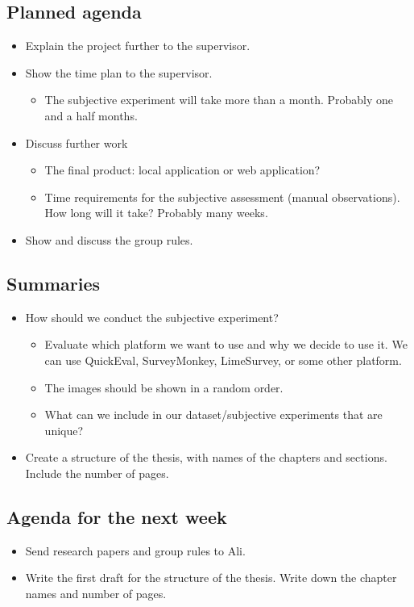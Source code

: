 \subsection*{Planned agenda}
\begin{itemize}
    \item Explain the project further to the supervisor.
    \item Show the time plan to the supervisor.
        \begin{itemize}
            \item The subjective experiment will take more than a month. Probably one and a half months.
    \end{itemize}
    \item Discuss further work
    \begin{itemize}
        \item The final product: local application or web application?
        \item Time requirements for the subjective assessment (manual observations). How long will it take? Probably many weeks.
    \end{itemize}
    \item Show and discuss the group rules.
\end{itemize}

\subsection*{Summaries}
\begin{itemize}
    \item How should we conduct the subjective experiment?
    \begin{itemize}
        \item Evaluate which platform we want to use and why we decide to use it. We can use QuickEval, SurveyMonkey, LimeSurvey, or some other platform.
        \item The images should be shown in a random order.
        \item What can we include in our dataset/subjective experiments that are unique?
    \end{itemize}
    \item Create a structure of the thesis, with names of the chapters and sections. Include the number of pages. 
\end{itemize}

\subsection*{Agenda for the next week}
\begin{itemize}
    \item Send research papers and group rules to Ali.
    \item Write the first draft for the structure of the thesis. Write down the chapter names and number of pages.
\end{itemize}



